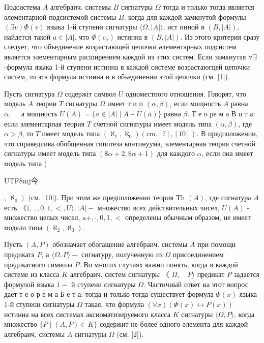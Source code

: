 \documentclass[10pt]{article}
\begin{document}
Подсистема $A$ алгебраич. системы $B$ сигнатуры $\Omega$ тогда и только тогда является әлементарной подсистемой системы $B$, когда для каждой замкнутой формулы $(\exists v) \Phi(v)$ языка 1-й ступени сигнатуры $\langle\Omega,|A|\rangle$, ист инной в $(B,|A|)$, найдется такой $a \in|A|$, что $\Phi\left(c_{a}\right)$ истинна в $(B,|A|)$. Из этого критерия сразу следует, что объединение возрастающей цепочки әлементарных подсистем является элементарным расширением каждой из этих систем. Если замкнутая $\forall \exists$-формула языка 1-й ступени истинна в каждой системе возрастаюгцей цепочки систем, то эта формула истинна и в объединении этой цепочки (см. [1]).



Пусть сигнатура $\Omega$ содержіт символ $U$ одноместного отношения. Говорят, что модель $A$ теории $T$ сигнатуры $\Omega$ имеет т и п $(\alpha, \beta)$, если мощность $A$ равна $\alpha, \quad$ а мощность $U(A)=\{a \in|A| \mid A \models U(a)\}$ равна $\beta$. Т е о ре м а В о т а: если элементарная теория $T$ счетной сигнатуры имеет модель типа $(\alpha, \beta)$, где $\alpha>\beta$, то $T$ имеет модель типа $\left(\aleph_{1}, \aleph_{0}\right)(\mathrm{cm} .[7],[10])$. В предположении, что справедлива обобщенная гипотеза континуума, элементарная теория счетной сигнатуры имеет модель типа $(\$ \alpha+2, \$ \alpha+1)$ для каждого $\alpha$, если она имеет модель типа (\begin{CJK}{UTF8}{mj}今\end{CJK}, $\left.\boldsymbol{\aleph}_{0}\right)$ (см. [10]). При этом же предположении теория Th $(A)$, где сигнатура $A$ есть 〈†, $,, 0,1,<, U\rangle,|A|-$ множество всех действительных чисел, $U(A)$ - множество целых чисел, $\mathrm{a}+, \cdot, 0,1,<$ определены обычным образом, не имеет модели типа $\left(\aleph_{2}, \aleph_{0}\right)$.



Пусть $(A, P)$ обозначает обогащение алгебраич. системы $A$ при помощи предиката $P$, а $\langle\Omega, P\rangle-$ сигнатуру, полученную из $\Omega$ присоединением предикатного символа $P$. Во многих случаях важно понять, когда в каждой системе из класса $K$ алгебраич. систем сигнатуры 〈 $\Omega, \quad P\rangle$ предикат $P$ задается формулой языка $1-$ й ступени сигнатуры $\Omega$. Частичный ответ на этот вопрос дает т е о р е м а Б е т а: тогда и только тогда существует формула $\Phi(x)$ языка 1-й ступени сигнатуры $\Omega$ такая, что формула $(\forall x)(\Phi(x) \leftrightarrow P(x))$ истинна на всех системах аксиоматизируемого класса $K$ сигнатуры $\langle\Omega, P\rangle$, когда множество $\{P \mid(A, P) \in K\}$ содержит не более одного әлемента для каждой алгебраич. системы $A$ сигнатуры $\Omega$ (см. [2]).
\end{document}
